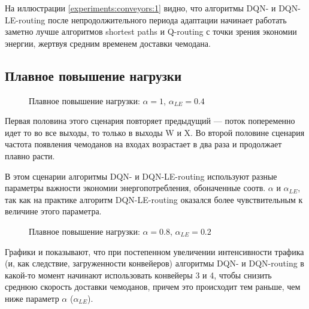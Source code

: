 \documentclass[specification,annotation,times]{itmo-student-thesis}
\theoremstyle{definition}
\begin{document}
На иллюстрации \ref{experiments:conveyors:1} видно, что алгоритмы DQN- и
DQN-LE-routing после непродолжительного периода адаптации начинает работать
заметно лучше алгоритмов shortest paths и Q-routing с точки зрения экономии энергии,
жертвуя средним временем доставки чемодана. 

\subsection{Плавное повышение нагрузки}

\begin{figure}[!h]
  \centering
  \hfil
  \caption{Плавное повышение нагрузки: $\alpha = 1$, $\alpha_{LE} = 0.4$}\label{experiments:conveyors:2-late}
\end{figure}

Первая половина этого сценария повторяет предыдущий --- поток попеременно идет то
во все выходы, то только в выходы W и X. Во второй половине сценария частота
появления чемоданов на входах возрастает в два раза и продолжает плавно расти.

В этом сценарии алгоритмы DQN- и DQN-LE-routing используют разные параметры
важности экономии энергопотребления, обоначенные соотв. $\alpha$ и
$\alpha_{LE}$, так как на практике алгоритм DQN-LE-routing оказался более
чувствительным к величине этого параметра.

\begin{figure}[!h]
  \centering
  \hfil
  \caption{Плавное повышение нагрузки: $\alpha = 0.8$, $\alpha_{LE} = 0.2$}\label{experiments:conveyors:2-early}
\end{figure}

Графики \label{experiments:conveyors:2-late}
и \label{experiments:conveyors:2-early} показывают, что при постепенном
увеличении интенсивности трафика (и, как следствие, загруженности конвейеров)
алгоритмы DQN- и DQN-routing в какой-то момент начинают использовать конвейеры 3
и 4, чтобы снизить среднюю скорость доставки чемоданов, причем это происходит
тем раньше, чем ниже параметр $\alpha$ ($\alpha_{LE}$).
\end{document}
